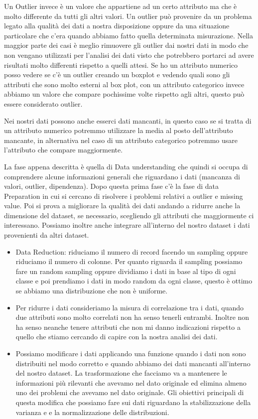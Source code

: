 \documentclass[14pt]{extreport}
\begin{document}
Un Outlier invece è un valore che appartiene ad un certo attributo ma che è molto differente da tutti gli altri valori. 
Un outlier può provenire da un problema legato alla qualità dei dati a nostra disposizione oppure da una situazione particolare che c'era quando abbiamo fatto quella determinata misurazione.
Nella maggior parte dei casi è meglio rimuovere gli outlier dai nostri dati in modo che non vengano utilizzati per l'analisi dei dati visto che potrebbero portarci ad avere risultati molto differenti rispetto a quelli attesi.
Se ho un attributo numerico posso vedere se c'è un outlier creando un boxplot e vedendo quali sono gli attributi che sono molto esterni al box plot, con un attributo categorico invece abbiamo un valore che compare pochissime volte rispetto agli altri, questo può essere considerato outlier.

Nei nostri dati possono anche esserci dati mancanti, in questo caso se si tratta di un attributo numerico potremmo utilizzare la media al posto dell'attributo mancante, in alternativa nel caso di un attributo categorico potremmo usare l'attributo che compare maggiormente.

La fase appena descritta è quella di Data understanding che quindi si occupa di comprendere alcune informazioni generali che riguardano i dati (mancanza di valori, outlier, dipendenza).
Dopo questa prima fase c'è la fase di data Preparation in cui si cercano di risolvere i problemi relativi a outlier e missing value. Poi si prova a migliorare la qualità dei dati andando a ridurre anche la dimensione del dataset, se necessario, scegliendo gli attributi che maggiormente ci interessano. Possiamo inoltre anche integrare all'interno del nostro dataset i dati provenienti da altri dataset.

\begin{itemize}
\item Data Reduction: riduciamo il numero di record facendo un sampling oppure riduciamo il numero di colonne. Per quanto riguarda il sampling possiamo fare un random sampling oppure dividiamo i dati in base al tipo di ogni classe e poi prendiamo i dati in modo random da ogni classe, questo è ottimo se abbiamo una distribuzione che non è uniforme.
\item Per ridurre i dati consideriamo la misura di correlazione tra i dati, quando due attributi sono molto correlati non ha senso tenerli entrambi. Inoltre non ha senso neanche tenere attributi che non mi danno indicazioni rispetto a quello che stiamo cercando di capire con la nostra analisi dei dati.
\item Possiamo modificare i dati applicando una funzione quando i dati non sono distribuiti nel modo corretto e quando abbiamo dei dati mancanti all'interno del nostro dataset. La trasformazione che facciamo va a mantenere le informazioni più rilevanti che avevamo nel dato originale ed elimina almeno uno dei problemi che avevamo nel dato originale.
Gli obiettivi principali di questa modifica che possiamo fare sui dati riguardano la stabilizzazione della varianza e e la normalizzazione delle distribuzioni.
\end{itemize}
\end{document}
